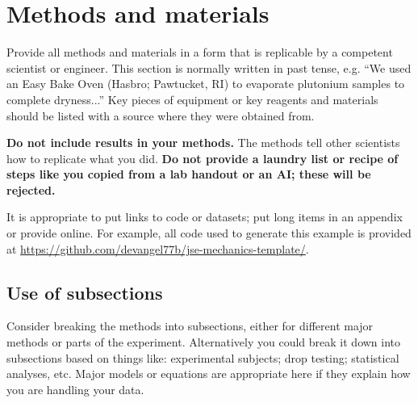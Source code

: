 \documentclass[amsmath,amssymb,aps,endfloats,linenumbers]{revtex4-2}
\begin{document}
\section{Methods and materials}
Provide all methods and materials in a form that is replicable by a competent scientist or engineer. This section is normally written in past tense, e.g. ``We used an Easy Bake Oven (Hasbro; Pawtucket, RI) to evaporate plutonium samples to complete dryness...'' Key pieces of equipment or key reagents and materials should be listed with a source where they were obtained from. 

\textbf{Do not include results in your methods.} The methods tell other scientists how to replicate what you did. \textbf{Do not provide a laundry list or recipe of steps like you copied from a lab handout or an AI; these will be rejected.} 

It is appropriate to put links to code or datasets; put long items in an appendix or provide online.  For example, all code used to generate this example is provided at \url{https://github.com/devangel77b/jse-mechanics-template/}. 


\subsection{Use of subsections}
Consider breaking the methods into subsections, either for different major methods or parts of the experiment. Alternatively you could break it down into subsections based on things like: experimental subjects; drop testing; statistical analyses, etc. Major models or equations are appropriate here if they explain how you are handling your data. 





        
\end{document}
